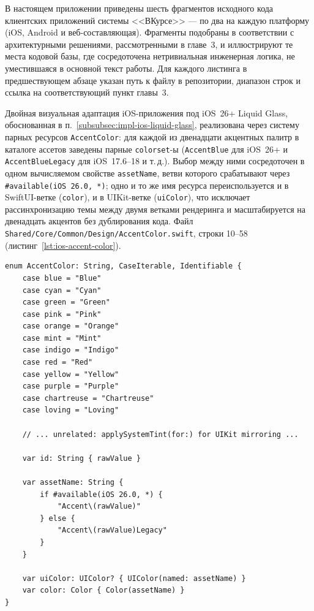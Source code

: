 
В настоящем приложении приведены шесть фрагментов исходного кода клиентских приложений системы <<ВКурсе>> --- по два на каждую платформу (iOS, Android и веб-составляющая). Фрагменты подобраны в соответствии с архитектурными решениями, рассмотренными в главе~3, и иллюстрируют те места кодовой базы, где сосредоточена нетривиальная инженерная логика, не уместившаяся в основной текст работы. Для каждого листинга в предшествующем абзаце указан путь к файлу в репозитории, диапазон строк и ссылка на соответствующий пункт главы~3.

Двойная визуальная адаптация iOS-приложения под iOS~26+ Liquid Glass, обоснованная в п.~\ref{subsubsec:impl-ios-liquid-glass}, реализована через систему парных ресурсов \texttt{AccentColor}: для каждой из двенадцати акцентных палитр в каталоге ассетов заведены парные \texttt{colorset}-ы (\texttt{AccentBlue} для iOS~26+ и \texttt{AccentBlueLegacy} для iOS~17.6--18 и т.\,д.). Выбор между ними сосредоточен в одном вычисляемом свойстве \texttt{assetName}, ветви которого срабатывают через \texttt{\#available(iOS 26.0, *)}; одно и то же имя ресурса переиспользуется и в SwiftUI-ветке (\texttt{color}), и в UIKit-ветке (\texttt{uiColor}), что исключает рассинхронизацию темы между двумя ветками рендеринга и масштабируется на двенадцать акцентов без дублирования кода. Файл \texttt{Shared/Core/Common/Design/AccentColor.swift}, строки 10--58 (листинг~\ref{lst:ios-accent-color}).

\begin{lstlisting}[caption={Парные colorset'ы \texttt{AccentColor} для двойной адаптации под iOS~26+ Liquid Glass},label=lst:ios-accent-color]
enum AccentColor: String, CaseIterable, Identifiable {
    case blue = "Blue"
    case cyan = "Cyan"
    case green = "Green"
    case pink = "Pink"
    case orange = "Orange"
    case mint = "Mint"
    case indigo = "Indigo"
    case red = "Red"
    case yellow = "Yellow"
    case purple = "Purple"
    case chartreuse = "Chartreuse"
    case loving = "Loving"

    // ... unrelated: applySystemTint(for:) for UIKit mirroring ...

    var id: String { rawValue }

    var assetName: String {
        if #available(iOS 26.0, *) {
            "Accent\(rawValue)"
        } else {
            "Accent\(rawValue)Legacy"
        }
    }

    var uiColor: UIColor? { UIColor(named: assetName) }
    var color: Color { Color(assetName) }
}
\end{lstlisting}


